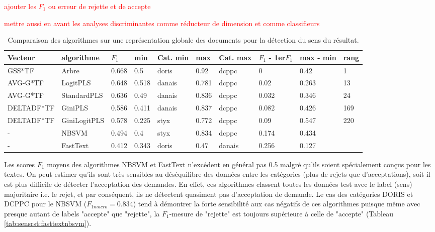 \begin{table}[!htb]	
	\scriptsize
	
	\textcolor{red}{ajouter les $F_1$ ou erreur de rejette et de accepte}
	
	\textcolor{red}{mettre aussi en avant les analyses discriminantes comme réducteur de dimension et comme classifieurs}
	
	\centering
	\begin{tabular}{|l|l|l|l|l|l|l|l|l|l|}
		\hline
		\textbf{Vecteur} & \textbf{algorithme} & \textbf{$F_1$} & \textbf{min} & \textbf{Cat. min} & \textbf{max} & \textbf{Cat. max} & \textbf{$F_1$ - 1er$F_1$} & \textbf{max - min} & \textbf{rang} \\ \hline
		GSS*TF & Arbre & 0.668 & 0.5 & doris & 0.92 & dcppc & 0 & 0.42 & 1 \\ \hline
		AVG-G*TF & LogitPLS & 0.648 & 0.518 & danais & 0.781 & dcppc & 0.02 & 0.263 & 13 \\ \hline
		AVG-G*TF & StandardPLS & 0.636 & 0.49 & danais & 0.836 & dcppc & 0.032 & 0.346 & 24 \\ \hline
		DELTADF*TF & GiniPLS & 0.586 & 0.411 & danais & 0.837 & dcppc & 0.082 & 0.426 & 169 \\ \hline
		DELTADF*TF & GiniLogitPLS & 0.578 & 0.225 & styx & 0.772 & dcppc & 0.09 & 0.547 & 220 \\ \hline
		- & NBSVM & 0.494 & 0.4 & styx & 0.834 & dcppc & 0.174 & 0.434 & \\ \hline
		- & FastText & 0.412 & 0.343 & doris & 0.47 & danais & 0.256 & 0.127 & \\ \hline
	\end{tabular}
\caption{Comparaison des algorithmes sur une représentation globale des documents pour la détection du sens du résultat.}\label{tab:sensrst:global}
\end{table}

 Les scores $F_1$ moyens des algorithmes NBSVM et FastText n'excédent en général pas 0.5 malgré qu'ils soient spécialement conçus pour les textes. On peut estimer qu'ils sont très sensibles au déséquilibre des données entre les catégories (plus de rejets que d'acceptations), soit il est plus difficile de détecter l'acceptation des demandes. En effet, ces algorithmes classent toutes les données test avec le label (sens) majoritaire i.e. le rejet, et par conséquent, ils ne détectent quasiment pas d'acceptation de demande. Le cas des catégories DORIS et DCPPC pour le NBSVM ($F_{1macro} = 0.834$) tend à démontrer la forte sensibilité aux cas négatifs de ces algorithmes puisque même avec presque autant de labels "accepte" que "rejette", la $F_1$-mesure de "rejette" est toujours supérieure à celle de "accepte" (Tableau \ref{tab:sensrst:fasttextnbsvm}). 
 
